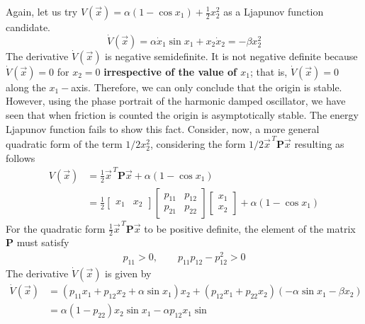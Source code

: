 \documentclass[12pt,a4paper,oneside]{book}
\begin{document}
\begin{onehalfspace}
\begin{example}
	Again, let us try $V(\vec{x})=\alpha(1-\cos x_1) + \frac{1}{2}x_2^2$ as a 
	Ljapunov function candidate.
	\begin{equation*}
		\dot{V}(\vec{x})=\alpha\dot{x}_1\sin x_1+x_2\dot{x}_2 = -\beta x_2^2
	\end{equation*}
	The derivative $\dot{V}(\vec{x})$ is negative semidefinite. It is not 
	negative definite because $\dot{V}(\vec{x})=0$ for $x_2=0$ 
	\textbf{irrespective of the value of $x_1$}; that is, $\dot{V}(\vec{x})=0$ 
	along the $x_1-$axis. Therefore, we can only conclude that the origin is 
	stable. However, using the phase portrait of the harmonic damped 
	oscillator, we have seen that when friction is counted the origin is 
	asymptotically stable. The energy Ljapunov function fails to show this 
	fact. Consider, now, a more general quadratic form of the term $1/2x_2^2$, 
	considering the form $1/2\vec{x}^{\,T}\mathbf{P}\vec{x}$ resulting as 
	follows
	\begin{equation*}
		\begin{aligned}
			{V}(\vec{x})&=\frac{1}{2}\vec{x}^{\,T}\mathbf{P}\vec{x} + 
			\alpha(1-\cos x_1) \\[6pt]
			&= \frac{1}{2}\begin{bmatrix} x_1&x_2\end{bmatrix}\begin{bmatrix} 
			p_{11}&p_{12} \\[6pt] p_{21}&p_{22}\end{bmatrix} \begin{bmatrix} 
			x_1 \\[6pt] x_2\end{bmatrix} +\alpha(1-\cos x_1)
		\end{aligned}
	\end{equation*}
	For the quadratic form $\frac{1}{2}\vec{x}^{\,T}\mathbf{P}\vec{x}$ to be 
	positive definite, the element of the matrix $\mathbf{P}$ must satisfy 
	\begin{equation*}
		\begin{aligned}
			p_{11} >0,\qquad p_{11}p_{12}-p_{12}^2>0
		\end{aligned}
	\end{equation*}
	The derivative $\dot{V}(\vec{x})$ is given by
	\begin{equation*}
		\begin{aligned}
			\dot{V}(\vec{x}) &= (p_{11}x_1+p_{12}x_2+\alpha\sin 
			x_1)x_2+(p_{12}x_1+p_{22}x_2)(-\alpha\sin x_1-\beta x_2) \\[6pt] &= 
			\alpha(1-p_{22})x_2\sin x_1-\alpha p_{12}x_1\sin 

\end{aligned}
\end{equation*}
\end{example}
\end{onehalfspace}
\end{document}
